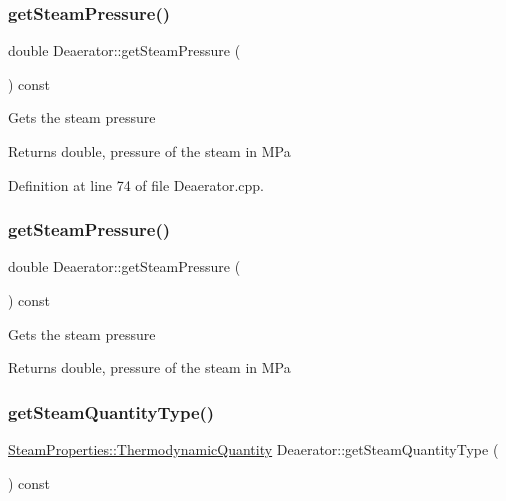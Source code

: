\subsubsection{\texorpdfstring{get\+Steam\+Pressure()}{getSteamPressure()}\hspace{0.1cm}{\footnotesize\ttfamily [2/3]}}
{\footnotesize\ttfamily double Deaerator\+::get\+Steam\+Pressure (\begin{DoxyParamCaption}{ }\end{DoxyParamCaption}) const}

Gets the steam pressure \begin{DoxyReturn}{Returns}
double, pressure of the steam in M\+Pa 
\end{DoxyReturn}


Definition at line 74 of file Deaerator.\+cpp.

\mbox{\label{class_deaerator_aebe779c63cace193d040f497e3b70728}} 
\subsubsection{\texorpdfstring{get\+Steam\+Pressure()}{getSteamPressure()}\hspace{0.1cm}{\footnotesize\ttfamily [3/3]}}
{\footnotesize\ttfamily double Deaerator\+::get\+Steam\+Pressure (\begin{DoxyParamCaption}{ }\end{DoxyParamCaption}) const}

Gets the steam pressure \begin{DoxyReturn}{Returns}
double, pressure of the steam in M\+Pa 
\end{DoxyReturn}
\mbox{\label{class_deaerator_a18abbdc5ec78f71e1d2495b0c64c77ec}} 
\subsubsection{\texorpdfstring{get\+Steam\+Quantity\+Type()}{getSteamQuantityType()}\hspace{0.1cm}{\footnotesize\ttfamily [1/3]}}
{\footnotesize\ttfamily \hyperlink{class_steam_properties_ae0294bedf7d178c2d8fb6aed0f62fbff}{Steam\+Properties\+::\+Thermodynamic\+Quantity} Deaerator\+::get\+Steam\+Quantity\+Type (\begin{DoxyParamCaption}{ }\end{DoxyParamCaption}) const}

